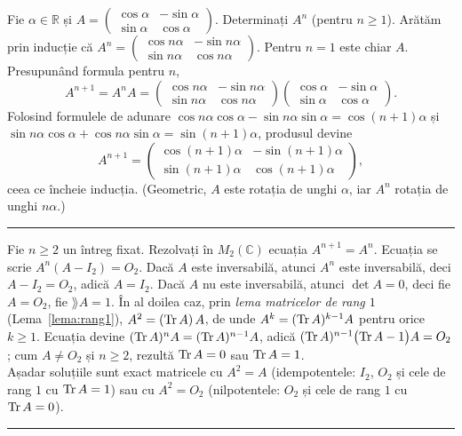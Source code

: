 Fie $\alpha\in\mathbb{R}$ și $A=\begin{pmatrix}\cos\alpha & -\sin\alpha\\ \sin\alpha & \cos\alpha\end{pmatrix}$. Determinați $A^n$ (pentru $n\ge1$).
\sol Arătăm prin inducție că $A^n=\begin{pmatrix}\cos n\alpha & -\sin n\alpha\\ \sin n\alpha & \cos n\alpha\end{pmatrix}$. Pentru $n=1$ este chiar $A$. Presupunând formula pentru $n$,
\[ A^{n+1}=A^n A=\begin{pmatrix}\cos n\alpha & -\sin n\alpha\\ \sin n\alpha & \cos n\alpha\end{pmatrix}\begin{pmatrix}\cos\alpha & -\sin\alpha\\ \sin\alpha & \cos\alpha\end{pmatrix}. \]
Folosind formulele de adunare $\cos n\alpha\cos\alpha-\sin n\alpha\sin\alpha=\cos(n+1)\alpha$ și $\sin n\alpha\cos\alpha+\cos n\alpha\sin\alpha=\sin(n+1)\alpha$, produsul devine
\[ A^{n+1}=\begin{pmatrix}\cos(n+1)\alpha & -\sin(n+1)\alpha\\ \sin(n+1)\alpha & \cos(n+1)\alpha\end{pmatrix}, \]
ceea ce încheie inducția. (Geometric, $A$ este rotația de unghi $\alpha$, iar $A^n$ rotația de unghi $n\alpha$.)
\vspace{1mm}\hrule

Fie $n\ge2$ un întreg fixat. Rezolvați în $M_2(\mathbb{C})$ ecuația $A^{n+1}=A^n$.
\sol Ecuația se scrie $A^n(A-I_2)=O_2$. Dacă $A$ este inversabilă, atunci $A^n$ este inversabilă, deci $A-I_2=O_2$, adică $A=I_2$. Dacă $A$ nu este inversabilă, atunci $\det A=0$, deci fie $A=O_2$, fie $\rang A=1$. În al doilea caz, prin \emph{lema matricelor de rang $1$} (Lema~\ref{lema:rang1}), $A^2=(\operatorname{Tr} A)\,A$, de unde $A^k=(\operatorname{Tr} A)^{k-1}A$ pentru orice $k\ge1$. Ecuația devine $(\operatorname{Tr} A)^n A=(\operatorname{Tr} A)^{n-1}A$, adică $(\operatorname{Tr} A)^{n-1}\bigl(\operatorname{Tr} A-1\bigr)A=O_2$; cum $A\neq O_2$ și $n\ge2$, rezultă $\operatorname{Tr} A=0$ sau $\operatorname{Tr} A=1$.\\[2pt]
Așadar soluțiile sunt exact matricele cu $A^2=A$ (idempotentele: $I_2$, $O_2$ și cele de rang $1$ cu $\operatorname{Tr} A=1$) sau cu $A^2=O_2$ (nilpotentele: $O_2$ și cele de rang $1$ cu $\operatorname{Tr} A=0$).
\vspace{1mm}\hrule

